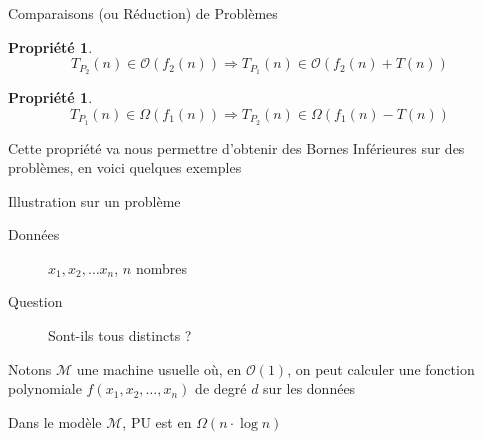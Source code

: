 \documentclass[aspectratio=1610,francais,envcountsect]{beamer}
\newtheorem{property}[theorem]{Propriété}
\begin{document}
\begin{frame}{Comparaisons (ou Réduction) de
    Problèmes\insertcontinuationtext}
  \begin{property}
    \begin{equation}
      \label{eq:p1}
      T_{P_2}(n) \in \mathcal{O}(f_2(n)) \Rightarrow  T_{P_1}(n)\in\mathcal{O}(f_2(n)+T(n))
    \end{equation}
  \end{property}

  \begin{property}
    \begin{equation}
      \label{eq:p2}
      T_{P_1}(n)\in\Omega(f_1(n)) \Rightarrow T_{P_2}(n)\in\Omega(f_1(n)-T(n))
    \end{equation}
  \end{property}

  Cette propriété va nous permettre d’obtenir des Bornes Inférieures
  sur des problèmes, en voici quelques exemples
\end{frame}

\begin{frame}{Illustration sur un problème}
  \begin{definition}
    \begin{description}
    \item[Données] $x_1,x_2,\ldots x_n$, $n$ nombres
    \item[Question] Sont-ils tous distincts ?
    \end{description}
  \end{definition}

  Notons $\mathcal{M}$ une machine usuelle où, en $\mathcal{O}(1)$, on
  peut calculer une fonction polynomiale $f(x_1, x_2, \ldots, x_n)$ de
  degré $d$ sur les données

  \begin{theorem}[Ben-Or, 1983]
    Dans le modèle $\mathcal{M}$, PU est en $\Omega(n\cdot\log n)$
  \end{theorem}
\end{frame}
\end{document}
